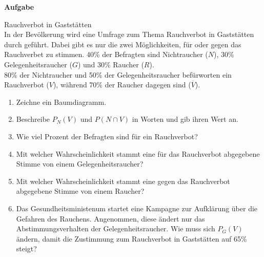 \documentclass[a4paper,12pt]{article}
\newcounter{aufgabencounter}
\newcommand{\aufgabeNr}{\stepcounter{aufgabencounter}{\theaufgabencounter}}
\newcommand{\Aufgabe}{
  {
  \vspace*{0.5cm}
  \textsf{\textbf{Aufgabe \aufgabeNr}}
  \vspace*{0.2cm}
  
  }
}
\begin{document}
\Aufgabe
Rauchverbot in Gaststätten\\
In der Bevölkerung wird eine Umfrage zum Thema Rauchverbot in Gaststätten durch geführt. Dabei gibt es nur die zwei Möglichkeiten, für oder gegen das Rauchverbet zu stimmen. 40\% der Befragten sind Nichtraucher ($N$), 30\% Gelegenheitsraucher ($G$) und 30\% Raucher ($R$).\\
80\% der Nichtraucher und 50\% der Gelegenheitsraucher befürworten ein Rauchverbot ($V$), während 70\% der Raucher dagegen sind ($\overline{V}$).
\begin{enumerate}[label={\alph*)}, topsep=5pt,itemsep=4ex,partopsep=1ex,parsep=1ex]
  \item Zeichne ein Baumdiagramm.
  \item Beschreibe $P_N(V)$ und $P(N\cap V)$ in Worten und gib ihren Wert an.
  \item Wie viel Prozent der Befragten sind für ein Rauchverbot?
  \item Mit welcher Wahrscheinlichkeit stammt eine für das Rauchverbot abgegebene Stimme von einem Gelegenheitsraucher?
  \item Mit welcher Wahrscheinlichkeit stammt eine gegen das Rauchverbot abgegebene Stimme von einem Raucher?
  \item Das Gesundheitsministenum startet eine Kampagne zur Aufklärung über die Gefahren des Rauchens. Angenommen, diese ändert nur das Abstimmungsverhalten der Gelegenheitsraucher. Wie muss sich $P_G(V)$ ändern, damit die Zustimmung zum Rauchverbot in Gaststätten auf 65\% steigt?
\end{enumerate}

\newpage


\begin{figure}[h!tp]
\vspace*{-0.66cm}
\end{figure}

\begin{figure}[h!tp]
\vspace*{-0.66cm}
\end{figure}

\end{document}
